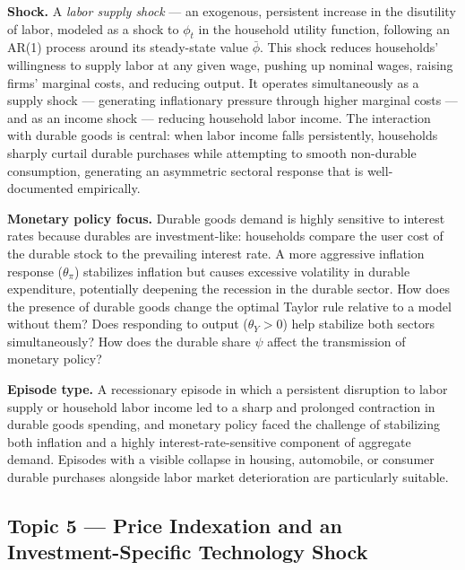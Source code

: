 \documentclass[11pt, a4paper]{article}
\begin{document}
\textbf{Shock.} A \textit{labor supply shock} --- an exogenous, persistent
increase in the disutility of labor, modeled as a shock to $\phi_t$ in the
household utility function, following an AR(1) process around its steady-state
value $\bar{\phi}$. This shock reduces households' willingness to supply labor
at any given wage, pushing up nominal wages, raising firms' marginal costs, and
reducing output. It operates simultaneously as a supply shock --- generating
inflationary pressure through higher marginal costs --- and as an income shock
--- reducing household labor income. The interaction with durable goods is
central: when labor income falls persistently, households sharply curtail
durable purchases while attempting to smooth non-durable consumption, generating
an asymmetric sectoral response that is well-documented empirically.

\textbf{Monetary policy focus.} Durable goods demand is highly sensitive to
interest rates because durables are investment-like: households compare the user
cost of the durable stock to the prevailing interest rate. A more aggressive
inflation response ($\theta_\pi$) stabilizes inflation but causes excessive
volatility in durable expenditure, potentially deepening the recession in the
durable sector. How does the presence of durable goods change the optimal Taylor
rule relative to a model without them? Does responding to output ($\theta_Y >
0$) help stabilize both sectors simultaneously? How does the durable share
$\psi$ affect the transmission of monetary policy?

\textbf{Episode type.} A recessionary episode in which a persistent disruption
to labor supply or household labor income led to a sharp and prolonged
contraction in durable goods spending, and monetary policy faced the challenge
of stabilizing both inflation and a highly interest-rate-sensitive component of
aggregate demand. Episodes with a visible collapse in housing, automobile, or
consumer durable purchases alongside labor market deterioration are particularly
suitable.

\subsection{Topic 5 --- Price Indexation and an Investment-Specific Technology
Shock}
\end{document}
